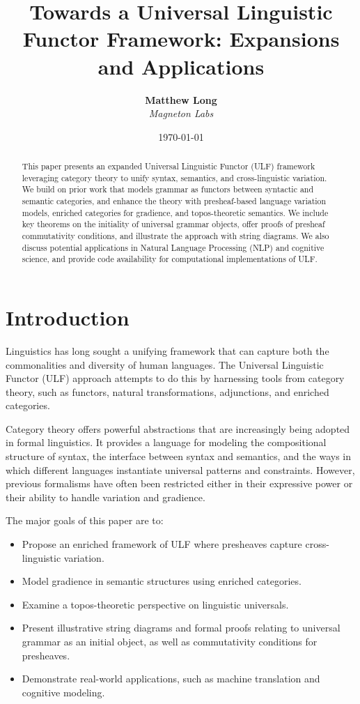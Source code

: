 \documentclass[12pt]{article}
\title{Towards a Universal Linguistic Functor Framework: Expansions and Applications}
\author{
  \textbf{Matthew Long}\\
  \textit{Magneton Labs}
}
\date{\today}
\theoremstyle{plain}
\theoremstyle{definition}
\begin{document}
\maketitle

\begin{abstract}
This paper presents an expanded Universal Linguistic Functor (ULF) framework leveraging category theory to unify syntax, semantics, and cross-linguistic variation. We build on prior work that models grammar as functors between syntactic and semantic categories, and enhance the theory with presheaf-based language variation models, enriched categories for gradience, and topos-theoretic semantics. We include key theorems on the initiality of universal grammar objects, offer proofs of presheaf commutativity conditions, and illustrate the approach with string diagrams. We also discuss potential applications in Natural Language Processing (NLP) and cognitive science, and provide code availability for computational implementations of ULF.
\end{abstract}

\section{Introduction}
Linguistics has long sought a unifying framework that can capture both the commonalities and diversity of human languages. The Universal Linguistic Functor (ULF) approach attempts to do this by harnessing tools from category theory, such as functors, natural transformations, adjunctions, and enriched categories. 

Category theory offers powerful abstractions that are increasingly being adopted in formal linguistics. It provides a language for modeling the compositional structure of syntax, the interface between syntax and semantics, and the ways in which different languages instantiate universal patterns and constraints. However, previous formalisms have often been restricted either in their expressive power or their ability to handle variation and gradience.

The major goals of this paper are to:
\begin{itemize}
    \item Propose an enriched framework of ULF where presheaves capture cross-linguistic variation.
    \item Model gradience in semantic structures using enriched categories.
    \item Examine a topos-theoretic perspective on linguistic universals.
    \item Present illustrative string diagrams and formal proofs relating to universal grammar as an initial object, as well as commutativity conditions for presheaves.
    \item Demonstrate real-world applications, such as machine translation and cognitive modeling.
\end{itemize}
\end{document}
